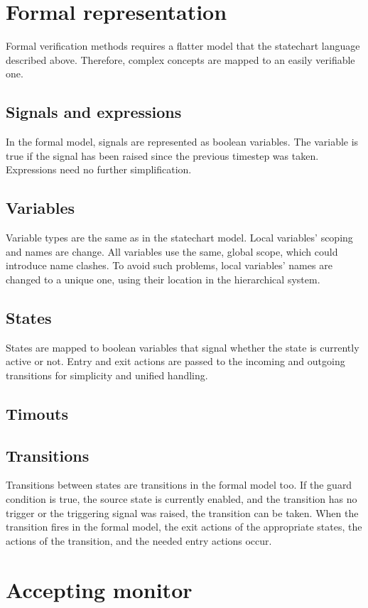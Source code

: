 {\section{Formal representation}
Formal verification methods requires a flatter model that the statechart language described above. Therefore, complex concepts are mapped to an easily verifiable one.
  \subsection{Signals and expressions}
In the formal model, signals are represented as boolean variables. The variable is true if the signal has been raised since the previous timestep was taken. Expressions need no further simplification.
  \subsection{Variables}
Variable types are the same as in the statechart model. Local variables' scoping and names are change. All variables use the same, global scope, which could introduce name clashes. To avoid such problems, local variables' names are changed to a unique one, using their location in the hierarchical system.
  \subsection{States}
States are mapped to boolean variables that signal whether the state is currently active or not. Entry and exit actions are passed to the incoming and outgoing transitions for simplicity and unified handling.
  \subsection{Timouts}
  \subsection{Transitions}
Transitions between states are transitions in the formal model too. If the guard condition is true, the source state is currently enabled, and the transition has no trigger or the triggering signal was raised, the transition can be taken. When the transition fires in the formal model, the exit actions of the appropriate states, the actions of the transition, and the needed entry actions occur.
\section{Accepting monitor}
}
